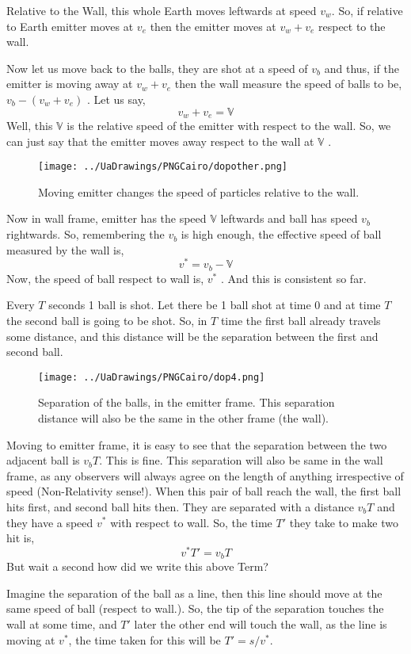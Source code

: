 \documentclass[a4paper]{article}
\begin{document}
Relative to the Wall, this whole Earth moves leftwards at speed $v_w$. So, if relative to Earth emitter moves at $v_e$ then
the emitter moves at $v_w + v_e$ respect to the wall. 

Now let us move back to the balls, they are shot at a speed of $v_b$ and thus, if the emitter is moving away at $v_w + v_e$ 
then the wall measure the speed of balls to be, $v_b - (v_w + v_e)$ . Let us say, 
\[ v_w + v_e = \mathbb{V}\]
Well, this $\mathbb{V}$ is the relative speed of the emitter with respect to the wall. So, we can just say that the emitter 
moves away respect to the wall at $\mathbb{V}$ . 
\begin{figure} [hbtp]
    \centering
    \texttt{[image: ../UaDrawings/PNGCairo/dopother.png]}
    \caption{Moving emitter changes the speed of particles relative to the wall.}
    \label{ }
\end{figure} 
Now in wall frame, emitter has the speed $\mathbb{V}$ leftwards and ball has speed $v_b$ rightwards. So, remembering the $v_b$ 
is high enough, the effective speed of ball measured by the wall is,
\[ v^* = v_b - \mathbb{V} \]
Now, the speed of ball respect to wall is, $v^*$ . And this is consistent so far. 

Every $T$ seconds 1 ball is shot. Let there be 1 ball shot at time $0$ and at time $T$ the second ball is going to be shot. 
So, in $T$ time the first ball already travels some distance, and this distance will be the separation between the first and second 
ball. 
\begin{figure} [hbtp]
    \centering
    \texttt{[image: ../UaDrawings/PNGCairo/dop4.png]}
    \caption{Separation of the balls, in the emitter frame. This separation distance will also be the same in the other frame (the wall).}
    \label{ }
\end{figure} 
Moving to emitter frame, it is easy to see that the separation between the two adjacent ball is $v_bT$. This is fine. This separation 
will also be same in the wall frame, as any observers will always agree on the length of anything irrespective of speed (Non-Relativity sense!). 
When this pair of ball reach the wall, the first ball hits first, and second ball hits then. They are separated with a distance
$v_b T$ and they have a speed $v^*$ with respect to wall. So, the time $T'$ they take to make two hit is, 
\[ v^* T '= v_b T\]
But wait a second how did we write this above Term? 

Imagine the separation of the ball as a line, then this line should move at the same speed of ball (respect to wall.). So, 
the tip of the separation touches the wall at some time, and $T'$ later the other end will touch the wall, as the line is 
moving at $v^*$, the time taken for this will be $T' = s/v^*$. 
\end{document}
